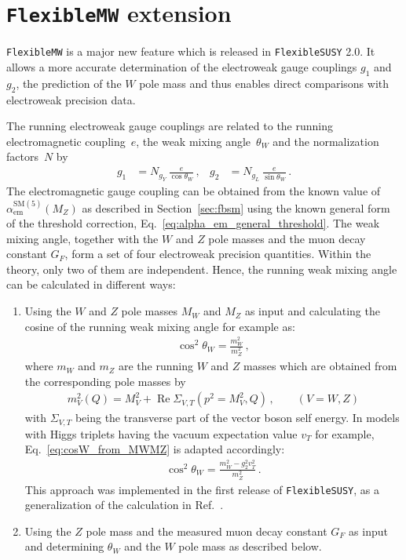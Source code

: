 \documentclass[final,3p,11pt,pdflatex]{elsarticle}
\makeatletter
\newcommand{\fs}{\texttt{FlexibleSUSY}\@\xspace}
\newcommand{\fstwo}{\fs 2.0\@\xspace}
\newcommand{\fmw}{\texttt{FlexibleMW}\@\xspace}
\newcommand{\SM}{\ensuremath{\text{SM}}\xspace}
\newcommand{\secref}[1]{Section~\ref{#1}}
\DeclareMathOperator{\re}{Re}
\def\aem{\alpha_{\text{em}}}
\makeatother
\begin{document}
\section{\fmw extension}
\label{sec:fmw}
\fmw is a major new feature which is released in \fstwo.
It allows a more accurate determination of the electroweak gauge
couplings $g_1$ and $g_2$, the prediction of the $W$ pole mass and thus
enables direct comparisons with electroweak precision data.

The running electroweak gauge couplings are related to the running
electromagnetic coupling~$e$, the weak mixing angle~$\theta_W$ and the
normalization factors~$N$ by
%
\begin{align}
  g_1 &= N_{g_Y}\,\frac{e}{\cos\theta_W}\,,
  & g_2 &= N_{g_L}\,\frac{e}{\sin\theta_W} \,.
\end{align}
%
The electromagnetic gauge coupling can be obtained from the known
value of $\aem^{\SM(5)}(M_Z)$ as described in
\secref{sec:fbsm} using the known general form of the threshold
correction, Eq.\ \eqref{eq:alpha_em_general_threshold}.
The weak mixing angle, together with the $W$ and $Z$ pole masses and
the muon decay constant $G_F$, form a set of four electroweak
precision quantities. Within the theory, only two of them are
independent. Hence, the running weak
mixing angle can be calculated in different ways:
%
\begin{enumerate}
\item Using the $W$ and $Z$ pole masses $M_W$ and $M_Z$ as input and
  calculating the cosine of the running weak mixing angle for example
  as:
  \begin{align}
    \cos^2\theta_W = \frac{m_W^2}{m_Z^2} \,,
    \label{eq:cosW_from_MWMZ}
  \end{align}
  where $m_W$ and $m_Z$ are the running $W$ and $Z$ masses which are
  obtained from the corresponding pole masses by
  \begin{align}
    m_V^2(Q) = M_V^2 + \re \Sigma_{V,T}(p^2 = M_V^2, Q) \,, \qquad (V=W,Z)
  \end{align}
  with $\Sigma_{V,T}$ being the transverse part of the vector boson
  self energy. In models with Higgs triplets having the
  vacuum expectation value $v_T$ for example,
  Eq.~\eqref{eq:cosW_from_MWMZ} is adapted accordingly:
  \begin{align}
    \cos^2\theta_W = \frac{m_W^2 - g_2^2 v_T^2}{m_Z^2} \,.
  \end{align}
  This approach was implemented in the first release of \fs \cite{Athron:2014yba},
  as a generalization of the calculation in Ref.\ \cite{Athron:2012pw}.
\item Using the $Z$ pole mass and the measured muon decay constant
  $G_F$ as input and determining $\theta_W$ and the $W$ pole mass
  as described below.
\end{enumerate}
\end{document}

